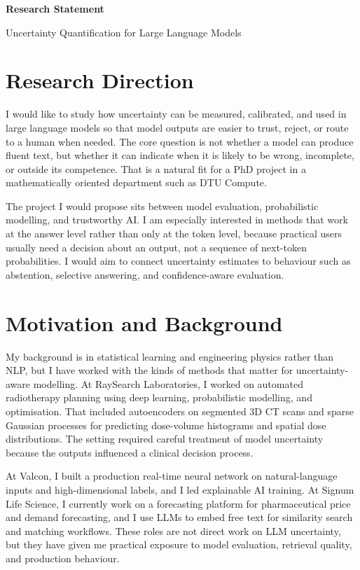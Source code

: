 \documentclass[11pt,a4paper]{article}
\newcommand{\statementtitle}[1]{%
  \begin{center}
    {\Large\bfseries #1}
  \end{center}
}
\newcommand{\statementsubtitle}[1]{%
  \begin{center}
    {\normalsize #1}
  \end{center}
  \vspace{0.5em}
}
\begin{document}
\statementtitle{Research Statement}
\statementsubtitle{Uncertainty Quantification for Large Language Models}

\section{Research Direction}
I would like to study how uncertainty can be measured, calibrated, and used in large language models so that model outputs are easier to trust, reject, or route to a human when needed. The core question is not whether a model can produce fluent text, but whether it can indicate when it is likely to be wrong, incomplete, or outside its competence. That is a natural fit for a PhD project in a mathematically oriented department such as DTU Compute.

The project I would propose sits between model evaluation, probabilistic modelling, and trustworthy AI. I am especially interested in methods that work at the answer level rather than only at the token level, because practical users usually need a decision about an output, not a sequence of next-token probabilities. I would aim to connect uncertainty estimates to behaviour such as abstention, selective answering, and confidence-aware evaluation.

\section{Motivation and Background}
My background is in statistical learning and engineering physics rather than NLP, but I have worked with the kinds of methods that matter for uncertainty-aware modelling. At RaySearch Laboratories, I worked on automated radiotherapy planning using deep learning, probabilistic modelling, and optimisation. That included autoencoders on segmented 3D CT scans and sparse Gaussian processes for predicting dose-volume histograms and spatial dose distributions. The setting required careful treatment of model uncertainty because the outputs influenced a clinical decision process.

At Valcon, I built a production real-time neural network on natural-language inputs and high-dimensional labels, and I led explainable AI training. At Signum Life Science, I currently work on a forecasting platform for pharmaceutical price and demand forecasting, and I use LLMs to embed free text for similarity search and matching workflows. These roles are not direct work on LLM uncertainty, but they have given me practical exposure to model evaluation, retrieval quality, and production behaviour.
\end{document}
